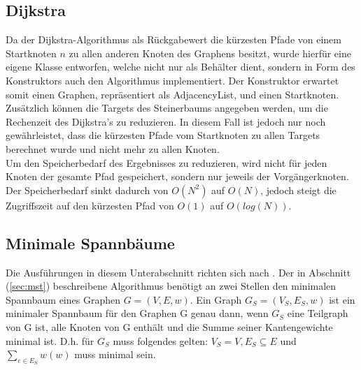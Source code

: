 \documentclass[a4paper,10pt]{article}
\begin{document}
\subsection{Dijkstra}
Da der Dijkstra-Algorithmus als Rückgabewert die kürzesten Pfade von einem Startknoten $n$ zu allen anderen Knoten des Graphens besitzt,
wurde hierfür eine eigene Klasse entworfen, welche nicht nur als Behälter dient, sondern in Form des Konstruktors auch den Algorithmus implementiert.
Der Konstruktor erwartet somit einen Graphen, repräsentiert als AdjacencyList, und einen Startknoten. Zusätzlich können die Targets des Steinerbaums
angegeben werden, um die Rechenzeit des Dijkstra's zu reduzieren. In diesem Fall ist jedoch nur noch gewährleistet, dass die kürzesten Pfade vom Startknoten
zu allen Targets berechnet wurde und nicht mehr zu allen Knoten.\\
Um den Speicherbedarf des Ergebnisses zu reduzieren, wird nicht für jeden Knoten der gesamte Pfad gespeichert, sondern nur jeweils der Vorgängerknoten.
Der Speicherbedarf sinkt dadurch von $O(N^2)$ auf $O(N)$, jedoch steigt die Zugriffszeit auf den kürzesten Pfad von $O(1)$ auf $O(log(N))$.



\subsection{Minimale Spannbäume}
Die Ausführungen in diesem Unterabschnitt richten sich nach \cite[Kapitel 23]{cormen}.
Der in Abschnitt (\ref{sec:mst}) beschreibene Algorithmus benötigt an zwei Stellen den minimalen Spannbaum eines Graphen $G=(V,E,w)$. Ein Graph
$G_S=(V_S,E_S,w)$ ist ein minimaler Spannbaum für den Graphen G genau dann, wenn $G_S$ eine Teilgraph von G ist, alle Knoten von G enthält und die Summe
seiner Kantengewichte minimal ist. D.h. für $G_S$ muss folgendes gelten: $V_S=V, E_S \subseteq E$ und $\sum_{e \in E_S} w(w)$ muss minimal sein.
\end{document}
